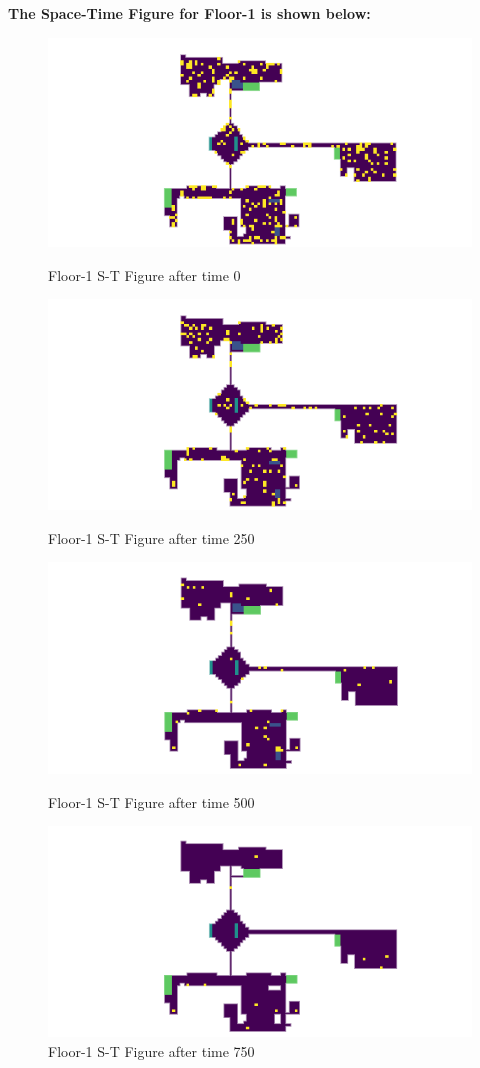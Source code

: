\documentclass{mcmthesis}
\begin{document}
\newpage
\noindent\textbf{The Space-Time Figure for Floor-1 is shown below:}
\begin{figure}[H]
\parbox[b]{.5\textwidth}{
\includegraphics[scale=0.7]{-1-1}
\centering\captionsetup{font=small, labelfont=bf}\caption{Floor-1 S-T Figure after time 0}
}
\parbox[b]{.5\textwidth}{
\includegraphics[scale=0.7]{-1-2}
\centering\captionsetup{font=small, labelfont=bf}\caption{Floor-1 S-T Figure after time 250}
}
\parbox[b]{.5\textwidth}{
\includegraphics[scale=0.7]{-1-3}
\centering\captionsetup{font=small, labelfont=bf}\caption{Floor-1 S-T Figure after time 500}
}
\parbox[b]{.5\textwidth}{
\includegraphics[scale=0.7]{-1-4}
\centering\captionsetup{font=small, labelfont=bf}\caption{Floor-1 S-T Figure after time 750}
}
\end{figure}
\end{document}

